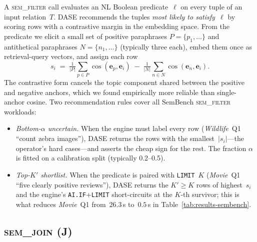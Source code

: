 A \textsc{sem\_filter} call evaluates an NL Boolean predicate~$\ell$ on
every tuple of an input relation~$T$. DASE recommends the tuples
\emph{most likely to satisfy~$\ell$} by scoring rows with a contrastive
margin in the embedding space. From the predicate we elicit a small set
of positive paraphrases $P{=}\{p_1,\ldots\}$ and antithetical
paraphrases $N{=}\{n_1,\ldots\}$ (typically three each), embed them
once as retrieval-query vectors, and assign each row
\[
  s_i \;=\;
    \tfrac{1}{|P|}\sum_{p\in P}\!\cos(\mathbf{e}_p,\mathbf{e}_i)
    \;-\;
    \tfrac{1}{|N|}\sum_{n\in N}\!\cos(\mathbf{e}_n,\mathbf{e}_i).
\]
The contrastive form cancels the topic component shared between the
positive and negative anchors, which we found empirically more reliable
than single-anchor cosine. Two recommendation rules cover all SemBench
\textsc{sem\_filter} workloads:
\begin{itemize}
\item \emph{Bottom-$\alpha$ uncertain.} When the engine must label every
  row (\emph{Wildlife}~Q1 ``count zebra images''), DASE returns the rows
  with the smallest~$|s_i|$---the operator's hard cases---and asserts the
  cheap sign for the rest. The fraction $\alpha$ is fitted on a
  calibration split (typically 0.2--0.5).
\item \emph{Top-$K'$ shortlist.} When the predicate is paired with
  \texttt{LIMIT~$K$} (\emph{Movie}~Q1 ``five clearly positive
  reviews''), DASE returns the $K'\!\geq\!K$ rows of highest~$s_i$ and
  the engine's \texttt{AI.IF}+\texttt{LIMIT} short-circuits at the
  $K$-th survivor; this is what reduces \emph{Movie}~Q1 from~$26.3$\,s
  to~$0.5$\,s in Table~\ref{tab:results-sembench}.
\end{itemize}

\subsection{\textsc{sem\_join} (J)}

